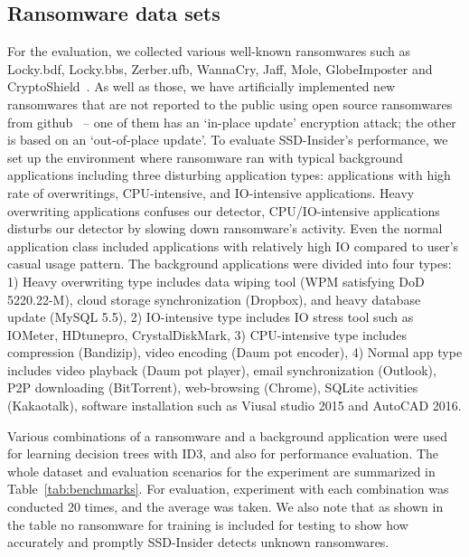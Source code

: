 \documentclass[conference]{IEEEtran}
\newcommand{\ours}{SSD-Insider}
\begin{document}
\subsection{Ransomware data sets}
For the evaluation, we collected various well-known ransomwares such as 
Locky.bdf, Locky.bbs, Zerber.ufb, 
WannaCry, Jaff, Mole, GlobeImposter and CryptoShield~\cite{virustotal}. 
As well as those, we have artificially implemented new ransomwares that are not
reported to the public using open source ransomwares from github~\cite{virgang,poc}
-- one of them has an `in-place update' encryption attack; the other is based on an `out-of-place update'.
To evaluate \ours{}'s performance,
we set up the environment where ransomware ran with typical background applications 
including three disturbing application types: applications with high rate of overwritings, 
CPU-intensive, and IO-intensive applications. Heavy overwriting applications confuses our detector,
CPU/IO-intensive applications disturbs our detector by slowing down ransomware's activity.
Even the normal application class included applications with relatively high IO compared to user's casual usage pattern.
The background applications were divided into four types:
1) Heavy overwriting type includes data wiping tool (WPM satisfying DoD 5220.22-M), cloud storage synchronization (Dropbox), and heavy database update (MySQL 5.5), 
2) IO-intensive type includes IO stress tool such as IOMeter, HDtunepro, CrystalDiskMark, 
3) CPU-intensive type includes compression (Bandizip), video encoding (Daum pot encoder),
4) Normal app type includes video playback (Daum pot player),
email synchronization (Outlook), P2P downloading (BitTorrent), web-browsing (Chrome), 
SQLite activities (Kakaotalk), software installation such as Viusal studio 2015 and AutoCAD 2016.

Various combinations of a ransomware and a background application were used 
for learning decision trees with ID3, and also for performance evaluation. 
The whole dataset and evaluation scenarios for the experiment are summarized in Table~\ref{tab:benchmarks}. 
For evaluation, experiment with each combination was conducted 20 times, and the average was taken.
We also note that as shown in the table no ransomware for training is included for testing to show 
how accurately and promptly \ours{} detects unknown ransomwares.
\end{document}
